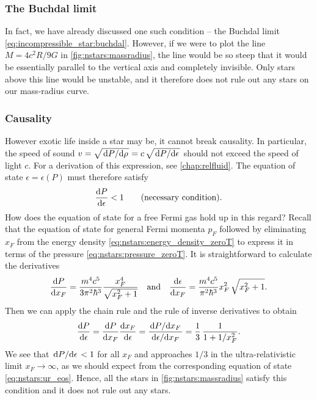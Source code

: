 \subsubsection{The Buchdal limit}

In fact, we have already discussed one such condition -- the Buchdal limit \eqref{eq:incompressible_star:buchdal}.
However, if we were to plot the line $M = 4 c^2 R / 9 G$ in \cref{fig:nstars:massradius}, the line would be so steep that it would be essentially parallel to the vertical axis and completely invisible.
Only stars above this line would be unstable, and it therefore does not rule out any stars on our mass-radius curve.

\subsubsection{Causality}

However exotic life inside a star may be, it cannot break causality. 
In particular, the speed of sound $v = \sqrt{\odv{P}/{\rho}} = c \, \sqrt{\odv{P}/{\epsilon}}$ should not exceed the speed of light $c$.
For a derivation of this expression, see \cref{chap:relfluid}.
The equation of state $\epsilon = \epsilon(P)$ must therefore satisfy
\begin{equation}
	\odv{P}{\epsilon} < 1
	\qquad \text{(necessary condition)} .
\end{equation}
How does the equation of state for a free Fermi gas hold up in this regard?
Recall that the equation of state for general Fermi momenta $p_F$ followed by eliminating $x_F$ from the energy density \eqref{eq:nstars:energy_density_zeroT} to express it in terms of the pressure \eqref{eq:nstars:pressure_zeroT}.
It is straightforward to calculate the derivatives
\begin{equation}
	\odv{P}{x_F} = \frac{m^4 c^5}{3 \pi^2 \hbar^3} \frac{x_F^4}{\sqrt{x_F^2 + 1}}
	\quad \text{and} \quad
	\odv{\epsilon}{x_F} = \frac{m^4 c^5}{\pi^2 \hbar^3} x_F^2 \, \sqrt{x_F^2 + 1} .
\end{equation}
Then we can apply the chain rule and the rule of inverse derivatives to obtain
\begin{equation}
	\odv{P}{\epsilon} = 
	\odv{P}{x_F} \odv{x_F}{\epsilon} =
	\frac{\odv{P}/{x_F}}{\odv{\epsilon}/{x_F}} =
	\frac13 \, \frac{1}{1+1/x_F^2}.
\label{eq:nstars:dPde}
\end{equation}
We see that $\odv{P}/{\epsilon} < 1$ for all $x_F$ and approaches $1/3$ in the ultra-relativistic limit $x_F \rightarrow \infty$, as we should expect from the corresponding equation of state \eqref{eq:nstars:ur_eos}.
Hence, all the stars in \cref{fig:nstars:massradius} satisfy this condition and it does not rule out any stars.

